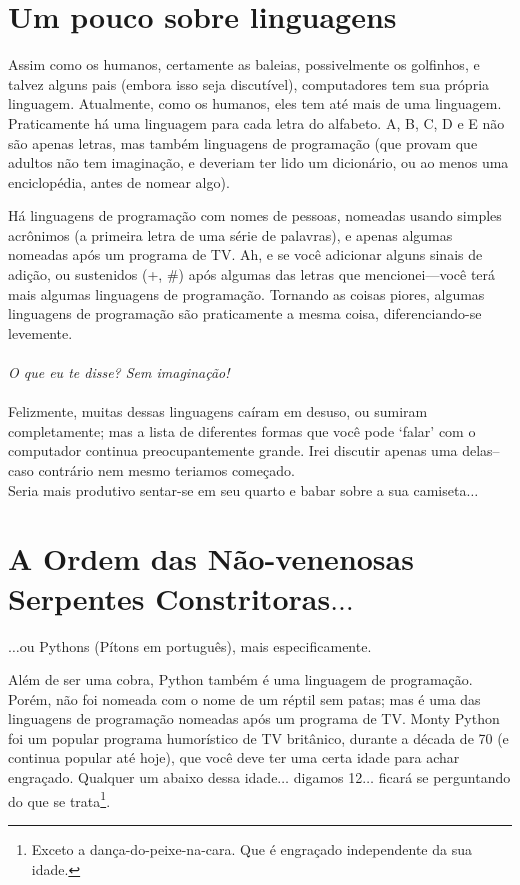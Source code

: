 \section{Um pouco sobre linguagens}

Assim como os humanos, certamente as baleias, possivelmente os golfinhos, e talvez alguns pais (embora isso seja discutível), computadores tem sua própria linguagem. Atualmente, como os humanos, eles tem até mais de uma linguagem. Praticamente há uma linguagem para cada letra do alfabeto. A, B, C, D e E não são apenas letras, mas também linguagens de programação (que provam que adultos não tem imaginação, e deveriam ter lido um dicionário, ou ao menos uma enciclopédia, antes de nomear algo).

Há linguagens de programação com nomes de pessoas, nomeadas usando simples acrônimos (a primeira letra de uma série de palavras), e apenas algumas nomeadas após um programa de TV. Ah, e se você adicionar alguns sinais de adição, ou sustenidos (+, \#) após algumas das letras que mencionei---você terá mais algumas linguagens de programação. Tornando as coisas piores, algumas linguagens de programação são praticamente a mesma coisa, diferenciando-se levemente.
\\
\\
\emph{O que eu te disse?  Sem imaginação!}
\\
\\
Felizmente, muitas dessas linguagens caíram em desuso, ou sumiram completamente; mas a lista de diferentes formas que você pode `falar' com o computador continua preocupantemente grande. Irei discutir apenas uma delas--caso contrário nem mesmo teriamos começado.
\\
Seria mais produtivo sentar-se em seu quarto e babar sobre a sua camiseta$\ldots$

\section{A Ordem das Não-venenosas \\Serpentes Constritoras$\ldots$}

$\ldots$ou Pythons (Pítons em português), mais especificamente.

Além de ser uma cobra, Python também é uma linguagem de programação. Porém, não foi nomeada com o nome de um réptil sem patas; mas é uma das linguagens de programação nomeadas após um programa de TV. Monty Python foi um popular programa humorístico de TV britânico, durante a década de 70 (e continua popular até hoje), que você deve ter uma certa idade para achar engraçado. Qualquer um abaixo dessa idade$\ldots$ digamos 12$\ldots$ ficará se perguntando do que se trata\footnote{Exceto a dança-do-peixe-na-cara. Que é engraçado independente da sua idade.}.

